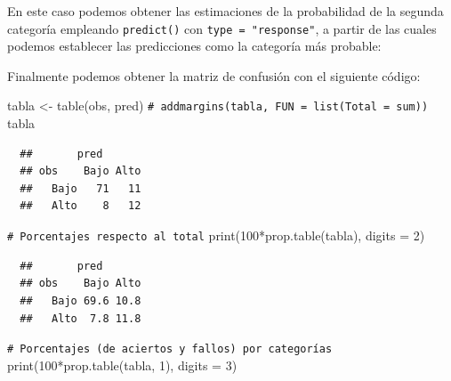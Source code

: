 \documentclass[
]{book}
\newenvironment{Shaded}{\begin{snugshade}}{\end{snugshade}}
\newcommand{\AttributeTok}[1]{\textcolor[rgb]{0.77,0.63,0.00}{#1}}
\newcommand{\CommentTok}[1]{\textcolor[rgb]{0.56,0.35,0.01}{\textit{#1}}}
\newcommand{\DecValTok}[1]{\textcolor[rgb]{0.00,0.00,0.81}{#1}}
\newcommand{\FloatTok}[1]{\textcolor[rgb]{0.00,0.00,0.81}{#1}}
\newcommand{\FunctionTok}[1]{\textcolor[rgb]{0.00,0.00,0.00}{#1}}
\newcommand{\NormalTok}[1]{#1}
\newcommand{\OtherTok}[1]{\textcolor[rgb]{0.56,0.35,0.01}{#1}}
\newcommand{\SpecialCharTok}[1]{\textcolor[rgb]{0.00,0.00,0.00}{#1}}
\newcommand{\StringTok}[1]{\textcolor[rgb]{0.31,0.60,0.02}{#1}}
\theoremstyle{break}
\theoremstyle{nonumberplain}
\renewcommand{\CommentTok}[1]{\textcolor[rgb]{0.41,0.41,0.41}{\texttt{#1}}}
\begin{document}
En este caso podemos obtener las estimaciones de la probabilidad de la segunda categoría empleando \texttt{predict()} con \texttt{type\ =\ "response"}, a partir de las cuales podemos establecer las predicciones como la categoría más probable:

\begin{Shaded}
\end{Shaded}

Finalmente podemos obtener la matriz de confusión con el siguiente código:

\begin{Shaded}
\begin{Highlighting}[]
\NormalTok{tabla }\OtherTok{\textless{}{-}} \FunctionTok{table}\NormalTok{(obs, pred)}
\CommentTok{\# addmargins(tabla, FUN = list(Total = sum))}
\NormalTok{tabla}
\end{Highlighting}
\end{Shaded}

\begin{verbatim}
  ##       pred
  ## obs    Bajo Alto
  ##   Bajo   71   11
  ##   Alto    8   12
\end{verbatim}

\begin{Shaded}
\begin{Highlighting}[]
\CommentTok{\# Porcentajes respecto al total}
\FunctionTok{print}\NormalTok{(}\DecValTok{100}\SpecialCharTok{*}\FunctionTok{prop.table}\NormalTok{(tabla), }\AttributeTok{digits =} \DecValTok{2}\NormalTok{) }
\end{Highlighting}
\end{Shaded}

\begin{verbatim}
  ##       pred
  ## obs    Bajo Alto
  ##   Bajo 69.6 10.8
  ##   Alto  7.8 11.8
\end{verbatim}

\begin{Shaded}
\begin{Highlighting}[]
\CommentTok{\# Porcentajes (de aciertos y fallos) por categorías}
\FunctionTok{print}\NormalTok{(}\DecValTok{100}\SpecialCharTok{*}\FunctionTok{prop.table}\NormalTok{(tabla, }\DecValTok{1}\NormalTok{), }\AttributeTok{digits =} \DecValTok{3}\NormalTok{) }
\end{Highlighting}
\end{Shaded}
\end{document}

